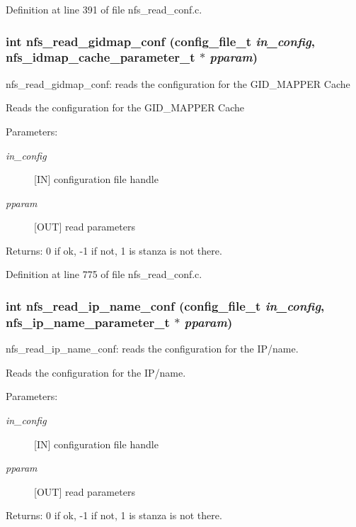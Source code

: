 Definition at line 391 of file nfs\_\-read\_\-conf.c.
\subsubsection{\setlength{\rightskip}{0pt plus 5cm}int nfs\_\-read\_\-gidmap\_\-conf (config\_\-file\_\-t {\em in\_\-config}, nfs\_\-idmap\_\-cache\_\-parameter\_\-t $\ast$ {\em pparam})}\label{nfs__read__conf_8c_a7}


nfs\_\-read\_\-gidmap\_\-conf: reads the configuration for the GID\_\-MAPPER Cache

Reads the configuration for the GID\_\-MAPPER Cache

\begin{Desc}
\item[Parameters:]
\begin{description}
\item[{\em in\_\-config}][IN] configuration file handle \item[{\em pparam}][OUT] read parameters\end{description}
\end{Desc}
\begin{Desc}
\item[Returns:]0 if ok, -1 if not, 1 is stanza is not there. \end{Desc}


Definition at line 775 of file nfs\_\-read\_\-conf.c.
\subsubsection{\setlength{\rightskip}{0pt plus 5cm}int nfs\_\-read\_\-ip\_\-name\_\-conf (config\_\-file\_\-t {\em in\_\-config}, nfs\_\-ip\_\-name\_\-parameter\_\-t $\ast$ {\em pparam})}\label{nfs__read__conf_8c_a3}


nfs\_\-read\_\-ip\_\-name\_\-conf: reads the configuration for the IP/name.

Reads the configuration for the IP/name.

\begin{Desc}
\item[Parameters:]
\begin{description}
\item[{\em in\_\-config}][IN] configuration file handle \item[{\em pparam}][OUT] read parameters\end{description}
\end{Desc}
\begin{Desc}
\item[Returns:]0 if ok, -1 if not, 1 is stanza is not there. \end{Desc}


